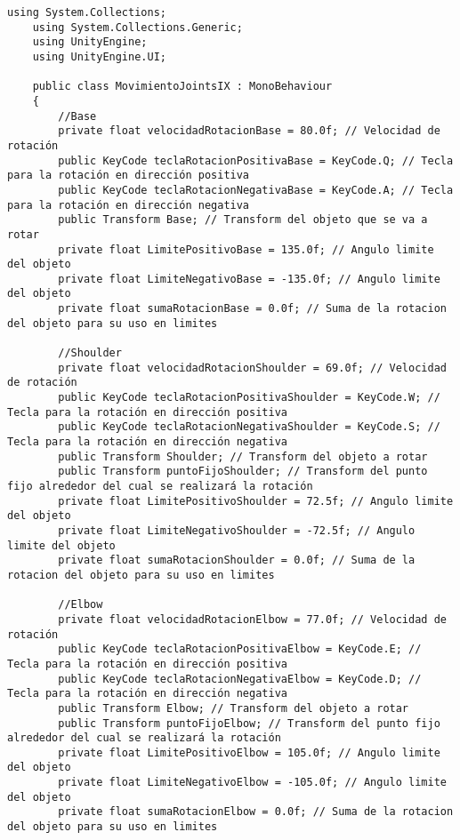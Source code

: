 \begin{lstlisting}[frame=single]
    using System.Collections;
    using System.Collections.Generic;
    using UnityEngine;
    using UnityEngine.UI;
    
    public class MovimientoJointsIX : MonoBehaviour
    {
        //Base
        private float velocidadRotacionBase = 80.0f; // Velocidad de rotación
        public KeyCode teclaRotacionPositivaBase = KeyCode.Q; // Tecla para la rotación en dirección positiva
        public KeyCode teclaRotacionNegativaBase = KeyCode.A; // Tecla para la rotación en dirección negativa
        public Transform Base; // Transform del objeto que se va a rotar
        private float LimitePositivoBase = 135.0f; // Angulo limite del objeto
        private float LimiteNegativoBase = -135.0f; // Angulo limite del objeto
        private float sumaRotacionBase = 0.0f; // Suma de la rotacion del objeto para su uso en limites
    
        //Shoulder
        private float velocidadRotacionShoulder = 69.0f; // Velocidad de rotación
        public KeyCode teclaRotacionPositivaShoulder = KeyCode.W; // Tecla para la rotación en dirección positiva
        public KeyCode teclaRotacionNegativaShoulder = KeyCode.S; // Tecla para la rotación en dirección negativa
        public Transform Shoulder; // Transform del objeto a rotar
        public Transform puntoFijoShoulder; // Transform del punto fijo alrededor del cual se realizará la rotación
        private float LimitePositivoShoulder = 72.5f; // Angulo limite del objeto
        private float LimiteNegativoShoulder = -72.5f; // Angulo limite del objeto
        private float sumaRotacionShoulder = 0.0f; // Suma de la rotacion del objeto para su uso en limites
    
        //Elbow
        private float velocidadRotacionElbow = 77.0f; // Velocidad de rotación
        public KeyCode teclaRotacionPositivaElbow = KeyCode.E; // Tecla para la rotación en dirección positiva
        public KeyCode teclaRotacionNegativaElbow = KeyCode.D; // Tecla para la rotación en dirección negativa
        public Transform Elbow; // Transform del objeto a rotar
        public Transform puntoFijoElbow; // Transform del punto fijo alrededor del cual se realizará la rotación
        private float LimitePositivoElbow = 105.0f; // Angulo limite del objeto
        private float LimiteNegativoElbow = -105.0f; // Angulo limite del objeto
        private float sumaRotacionElbow = 0.0f; // Suma de la rotacion del objeto para su uso en limites
    

\end{lstlisting}
